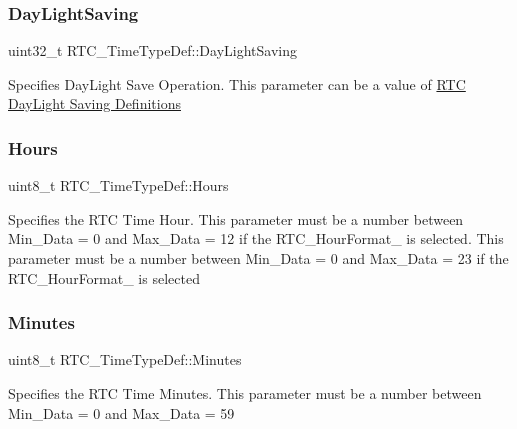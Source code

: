 \subsubsection{\texorpdfstring{Day\+Light\+Saving}{DayLightSaving}}
{\footnotesize\ttfamily uint32\+\_\+t R\+T\+C\+\_\+\+Time\+Type\+Def\+::\+Day\+Light\+Saving}

Specifies Day\+Light Save Operation. This parameter can be a value of \hyperlink{group___r_t_c___day_light_saving___definitions}{R\+TC Day\+Light Saving Definitions} \mbox{\label{struct_r_t_c___time_type_def_afb56ed968b4967d127517ebb4ed40d8b}} 
\subsubsection{\texorpdfstring{Hours}{Hours}}
{\footnotesize\ttfamily uint8\+\_\+t R\+T\+C\+\_\+\+Time\+Type\+Def\+::\+Hours}

Specifies the R\+TC Time Hour. This parameter must be a number between Min\+\_\+\+Data = 0 and Max\+\_\+\+Data = 12 if the R\+T\+C\+\_\+\+Hour\+Format\+\_ is selected. This parameter must be a number between Min\+\_\+\+Data = 0 and Max\+\_\+\+Data = 23 if the R\+T\+C\+\_\+\+Hour\+Format\+\_ is selected \mbox{\label{struct_r_t_c___time_type_def_a362931e6bba28836c36423197e429f29}} 
\subsubsection{\texorpdfstring{Minutes}{Minutes}}
{\footnotesize\ttfamily uint8\+\_\+t R\+T\+C\+\_\+\+Time\+Type\+Def\+::\+Minutes}

Specifies the R\+TC Time Minutes. This parameter must be a number between Min\+\_\+\+Data = 0 and Max\+\_\+\+Data = 59 \mbox{\label{struct_r_t_c___time_type_def_ab9e6aabb125b82b1e25cd1070a2d2ecb}} 
